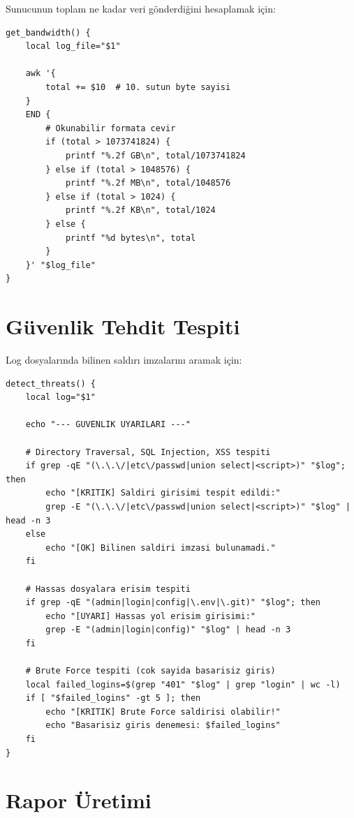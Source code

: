 \documentclass[12pt,a4paper]{report}
\begin{document}
Sunucunun toplam ne kadar veri gönderdiğini hesaplamak için:

\begin{lstlisting}[style=bashstyle,caption={Bant Genisligi Hesaplama}]
get_bandwidth() {
    local log_file="$1"
    
    awk '{
        total += $10  # 10. sutun byte sayisi
    }
    END {
        # Okunabilir formata cevir
        if (total > 1073741824) {
            printf "%.2f GB\n", total/1073741824
        } else if (total > 1048576) {
            printf "%.2f MB\n", total/1048576
        } else if (total > 1024) {
            printf "%.2f KB\n", total/1024
        } else {
            printf "%d bytes\n", total
        }
    }' "$log_file"
}
\end{lstlisting}

\section{Güvenlik Tehdit Tespiti}

Log dosyalarında bilinen saldırı imzalarını aramak için:

\begin{lstlisting}[style=bashstyle,caption={Guvenlik Taramasi}]
detect_threats() {
    local log="$1"
    
    echo "--- GUVENLIK UYARILARI ---"
    
    # Directory Traversal, SQL Injection, XSS tespiti
    if grep -qE "(\.\.\/|etc\/passwd|union select|<script>)" "$log"; then
        echo "[KRITIK] Saldiri girisimi tespit edildi:"
        grep -E "(\.\.\/|etc\/passwd|union select|<script>)" "$log" | head -n 3
    else
        echo "[OK] Bilinen saldiri imzasi bulunamadi."
    fi
    
    # Hassas dosyalara erisim tespiti
    if grep -qE "(admin|login|config|\.env|\.git)" "$log"; then
        echo "[UYARI] Hassas yol erisim girisimi:"
        grep -E "(admin|login|config)" "$log" | head -n 3
    fi
    
    # Brute Force tespiti (cok sayida basarisiz giris)
    local failed_logins=$(grep "401" "$log" | grep "login" | wc -l)
    if [ "$failed_logins" -gt 5 ]; then
        echo "[KRITIK] Brute Force saldirisi olabilir!"
        echo "Basarisiz giris denemesi: $failed_logins"
    fi
}
\end{lstlisting}

\section{Rapor Üretimi}
\end{document}
